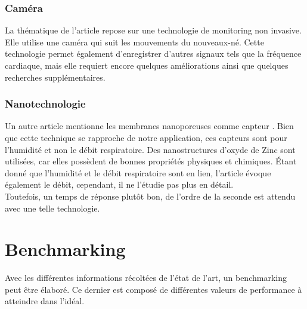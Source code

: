 \subsubsection{Caméra}
La thématique de l'article \cite{villarroel_non-contact_2019} repose sur une technologie de monitoring non invasive. Elle utilise une caméra qui suit les mouvements du nouveaux-né. 
Cette technologie permet également d'enregistrer d'autres signaux tels que la fréquence cardiaque, mais elle requiert encore quelques améliorations 
ainsi que quelques recherches supplémentaires. 

\subsubsection{Nanotechnologie}
Un autre article mentionne les membranes nanoporeuses comme capteur \cite{moharamzadeh_fabrication_2018}. Bien que cette technique se rapproche 
de notre application, ces capteurs sont pour l'humidité et non le débit respiratoire. Des nanostructures d'oxyde de Zinc sont utilisées, car 
elles possèdent de bonnes propriétés physiques et chimiques. Étant donné que l'humidité et le débit respiratoire sont en lien, l'article évoque 
également le débit, cependant, il ne l'étudie pas plus en détail. \\
Toutefois, un temps de réponse plutôt bon, de l'ordre de la seconde est attendu avec une telle technologie. 

\section{Benchmarking}
Avec les différentes informations récoltées de l'état de l'art, un benchmarking peut être élaboré. Ce dernier est composé de différentes valeurs 
de performance à atteindre dans l'idéal. 

